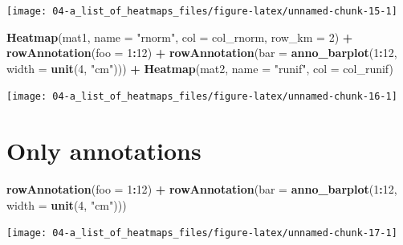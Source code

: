 \documentclass[]{book}
\newenvironment{Shaded}{\begin{snugshade}}{\end{snugshade}}
\newcommand{\KeywordTok}[1]{\textcolor[rgb]{0.13,0.29,0.53}{\textbf{#1}}}
\newcommand{\DataTypeTok}[1]{\textcolor[rgb]{0.13,0.29,0.53}{#1}}
\newcommand{\DecValTok}[1]{\textcolor[rgb]{0.00,0.00,0.81}{#1}}
\newcommand{\StringTok}[1]{\textcolor[rgb]{0.31,0.60,0.02}{#1}}
\newcommand{\OperatorTok}[1]{\textcolor[rgb]{0.81,0.36,0.00}{\textbf{#1}}}
\newcommand{\NormalTok}[1]{#1}
\theoremstyle{definition}
\theoremstyle{definition}
\theoremstyle{definition}
\theoremstyle{remark}
\begin{document}
\begin{center}\texttt{[image: 04-a\_list\_of\_heatmaps\_files/figure-latex/unnamed-chunk-15-1]} \end{center}

\begin{Shaded}
\begin{Highlighting}[]
\KeywordTok{Heatmap}\NormalTok{(mat1, }\DataTypeTok{name =} \StringTok{"rnorm"}\NormalTok{, }\DataTypeTok{col =}\NormalTok{ col_rnorm, }\DataTypeTok{row_km =} \DecValTok{2}\NormalTok{) }\OperatorTok{+}\StringTok{ }
\StringTok{    }\KeywordTok{rowAnnotation}\NormalTok{(}\DataTypeTok{foo =} \DecValTok{1}\OperatorTok{:}\DecValTok{12}\NormalTok{) }\OperatorTok{+}
\StringTok{    }\KeywordTok{rowAnnotation}\NormalTok{(}\DataTypeTok{bar =} \KeywordTok{anno_barplot}\NormalTok{(}\DecValTok{1}\OperatorTok{:}\DecValTok{12}\NormalTok{, }\DataTypeTok{width =} \KeywordTok{unit}\NormalTok{(}\DecValTok{4}\NormalTok{, }\StringTok{"cm"}\NormalTok{))) }\OperatorTok{+}
\StringTok{    }\KeywordTok{Heatmap}\NormalTok{(mat2, }\DataTypeTok{name =} \StringTok{"runif"}\NormalTok{, }\DataTypeTok{col =}\NormalTok{ col_runif)}
\end{Highlighting}
\end{Shaded}

\begin{center}\texttt{[image: 04-a\_list\_of\_heatmaps\_files/figure-latex/unnamed-chunk-16-1]} \end{center}

\section{Only annotations}\label{only-annotations}

\begin{Shaded}
\begin{Highlighting}[]
\KeywordTok{rowAnnotation}\NormalTok{(}\DataTypeTok{foo =} \DecValTok{1}\OperatorTok{:}\DecValTok{12}\NormalTok{) }\OperatorTok{+}
\StringTok{    }\KeywordTok{rowAnnotation}\NormalTok{(}\DataTypeTok{bar =} \KeywordTok{anno_barplot}\NormalTok{(}\DecValTok{1}\OperatorTok{:}\DecValTok{12}\NormalTok{, }\DataTypeTok{width =} \KeywordTok{unit}\NormalTok{(}\DecValTok{4}\NormalTok{, }\StringTok{"cm"}\NormalTok{)))}
\end{Highlighting}
\end{Shaded}

\begin{center}\texttt{[image: 04-a\_list\_of\_heatmaps\_files/figure-latex/unnamed-chunk-17-1]} \end{center}
\end{document}

